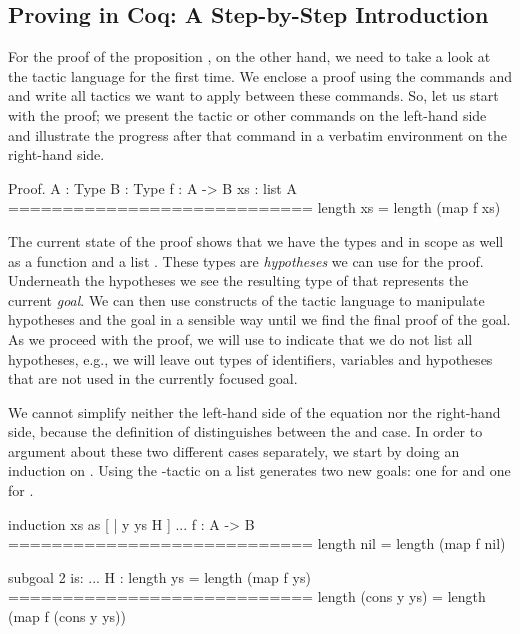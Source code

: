 \subsection{Proving in Coq: A Step-by-Step Introduction}
For the proof of the proposition , on the other hand, we need to take a look at the tactic language  for the first time.
We enclose a proof using the commands  and  and write all tactics we want to apply between these commands.
So, let us start with the proof; we present the tactic or other commands on the left-hand side and illustrate the progress after that command in a verbatim environment on the right-hand side.

\begin{cproof}{Proof.}
  A : Type
  B : Type
  f : A -> B
  xs : list A
  ============================
  length xs = length (map f xs)
\end{cproof}

The current state of the proof shows that we have the types  and  in scope as well as a function  and a list .
These types are \emph{hypotheses} we can use for the proof.
Underneath the hypotheses we see the resulting type of  that represents the current \emph{goal}.
We can then use constructs of the tactic language to manipulate hypotheses and the goal in a sensible way until we find the final proof of the goal.
As we proceed with the proof, we will use  to indicate that we do not list all hypotheses, e.g., we will leave out types of identifiers, variables and hypotheses that are not used in the currently focused goal.

We cannot simplify neither the left-hand side of the equation nor the right-hand side, because the definition of  distinguishes between the  and  case.
In order to argument about these two different cases separately, we start by doing an induction on .
Using the -tactic on a list generates two new goals: one for  and one for .

\begin{cproof}{induction xs as [ | y ys H ]}
  ...
  f : A -> B
  ============================
  length nil = length (map f nil)

subgoal 2 is:
  ...
  H : length ys = length (map f ys)
  ============================
  length (cons y ys) =
  length (map f (cons y ys))
\end{cproof}

